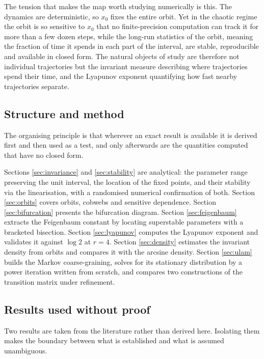 \documentclass[11pt,a4paper]{article}
\theoremstyle{definition}
\theoremstyle{remark}
\begin{document}
The tension that makes the map worth studying numerically is this. The
dynamics are deterministic, so $x_0$ fixes the entire orbit. Yet in the
chaotic regime the orbit is so sensitive to $x_0$ that no finite-precision
computation can track it for more than a few dozen steps, while the long-run
statistics of the orbit, meaning the fraction of time it spends in each part
of the interval, are stable, reproducible and available in closed form. The
natural objects of study are therefore not individual trajectories but the
invariant measure describing where trajectories spend their time, and the
Lyapunov exponent quantifying how fast nearby trajectories separate.

\subsection{Structure and method}

The organising principle is that wherever an exact result is available it is
derived first and then used as a test, and only afterwards are the quantities
computed that have no closed form.

Sections \ref{sec:invariance} and \ref{sec:stability} are analytical: the
parameter range preserving the unit interval, the location of the fixed
points, and their stability via the linearisation, with a randomised numerical
confirmation of both. Section \ref{sec:orbits} covers orbits, cobwebs and
sensitive dependence. Section \ref{sec:bifurcation} presents the bifurcation
diagram. Section \ref{sec:feigenbaum} extracts the Feigenbaum constant by
locating superstable parameters with a bracketed bisection. Section
\ref{sec:lyapunov} computes the Lyapunov exponent and validates it against
$\log 2$ at $r=4$. Section \ref{sec:density} estimates the invariant density
from orbits and compares it with the arcsine density. Section \ref{sec:ulam}
builds the Markov coarse-graining, solves for its stationary distribution by a
power iteration written from scratch, and compares two constructions of the
transition matrix under refinement.

\subsection{Results used without proof}
\label{sec:cited}

Two results are taken from the literature rather than derived here. Isolating
them makes the boundary between what is established and what is assumed unambiguous.
\end{document}
